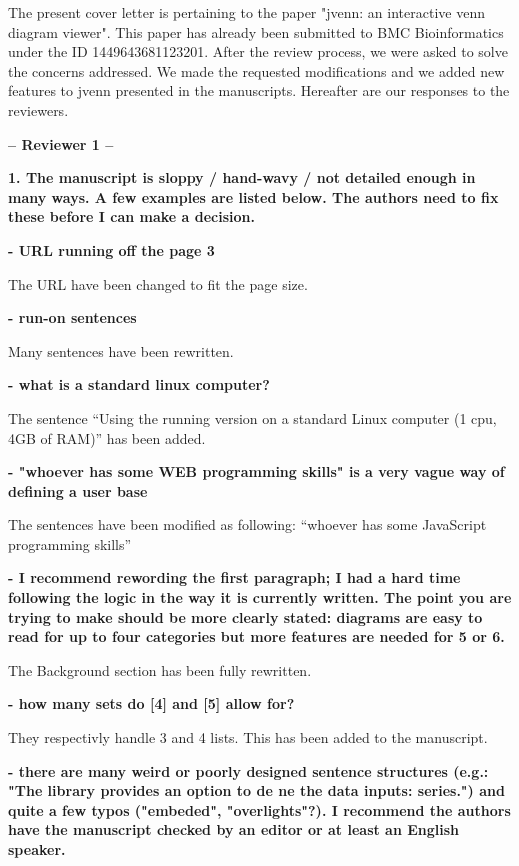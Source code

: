 \documentclass[10pt,stdletter,dateno,sigleft]{newlfm} %
\begin{document}
\begin{newlfm}


The present cover letter is pertaining to the paper "jvenn: an interactive venn
diagram viewer". This paper has already been submitted to BMC Bioinformatics 
under the ID 1449643681123201. After the review process, we were asked to
solve the concerns addressed. We made the requested modifications and we added 
new features to jvenn presented in the manuscripts. Hereafter are our responses 
to the reviewers.



\textbf{-- Reviewer 1 --}

\textbf{1. The manuscript is sloppy / hand-wavy / not detailed enough in many
ways. A few examples are listed below. The authors need to fix these before I
can make a decision.}

\textbf{- URL running off the page 3}

The URL have been changed to fit the page size. 

\textbf{- run-on sentences}

Many sentences have been rewritten.

\textbf{- what is a standard linux computer?}

The sentence ``Using the running version on a standard Linux computer (1 cpu,
4GB of RAM)'' has been added.

\textbf{- "whoever has some WEB programming skills" is a very vague way of
defining a user base}

The sentences have been modified as following: ``whoever has some JavaScript 
programming skills''

\textbf{- I recommend rewording the first paragraph; I had a hard time following
the logic in the way it is currently written. The point you are trying to make 
should be more clearly stated: diagrams are easy to read for up to four
categories but more features are needed for 5 or 6.}

The Background section has been fully rewritten.

\textbf{- how many sets do [4] and [5] allow for?}

They respectivly handle 3 and 4 lists. This has been added to the manuscript.


\textbf{- there are many weird or poorly designed sentence structures (e.g.:
"The library provides an option to de ne the data inputs: series.") and quite a 
few typos ("embeded", "overlights"?). I recommend the authors have the manuscript
checked by an editor or at least an English speaker.}


\end{newlfm}
\end{document}
